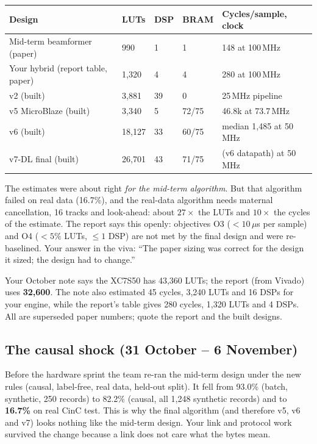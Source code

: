 \documentclass[11pt]{article}
\begin{document}
\begin{lesson}
\begin{center}
\small
\begin{tabular}{@{}lllll@{}}
\toprule
\textbf{Design} & \textbf{LUTs} & \textbf{DSP} & \textbf{BRAM} & \textbf{Cycles/sample, clock} \\
\midrule
Mid-term beamformer (paper) & 990 & 1 & 1 & 148 at 100\,MHz \\
Your hybrid (report table, paper) & 1,320 & 4 & 4 & 280 at 100\,MHz \\
v2 (built) & 3,881 & 39 & 0 & 25\,MHz pipeline \\
v5 MicroBlaze (built) & 3,340 & 5 & 72/75 & 46.8k at 73.7\,MHz \\
v6 (built) & 18,127 & 33 & 60/75 & median 1,485 at 50\,MHz \\
v7-DL final (built) & 26,701 & 43 & 71/75 & (v6 datapath) at 50\,MHz \\
\bottomrule
\end{tabular}
\end{center}
The estimates were about right \emph{for the mid-term algorithm}. But that algorithm failed on real data (16.7\%), and the real-data algorithm needs maternal cancellation, 16 tracks and look-ahead: about $27\times$ the LUTs and $10\times$ the cycles of the estimate. The report says this openly: objectives O3 ($<10\,\mu$s per sample) and O4 ($<5\%$ LUTs, $\le 1$ DSP) are not met by the final design and were re-baselined. Your answer in the viva: ``The paper sizing was correct for the design it sized; the design had to change.''
\end{lesson}

\begin{warn}
Your October note says the XC7S50 has 43,360 LUTs; the report (from Vivado) uses \textbf{32,600}. The note also estimated 45 cycles, 3,240 LUTs and 16 DSPs for your engine, while the report's table gives 280 cycles, 1,320 LUTs and 4 DSPs. All are superseded paper numbers; quote the report and the built designs.
\end{warn}

\subsection{The causal shock (31 October -- 6 November)}

Before the hardware sprint the team re-ran the mid-term design under the new rules (causal, label-free, real data, held-out split). It fell from 93.0\% (batch, synthetic, 250 records) to 82.2\% (causal, all 1,248 synthetic records) and to \textbf{16.7\%} on real CinC test. This is why the final algorithm (and therefore v5, v6 and v7) looks nothing like the mid-term design. Your link and protocol work survived the change because a link does not care what the bytes mean.
\end{document}
